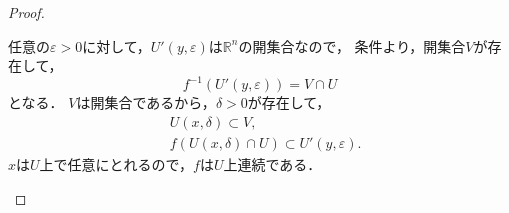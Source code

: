 \begin{leftbar}
\begin{proof}
\begin{enumerate}[(I)]
                  任意の$\varepsilon >0$に対して，$U'(y,\varepsilon)$は$\mathbb{R}^n$の開集合なので，
                  条件より，開集合$V$が存在して，
                  \[
                      f^{-1} (U'(y,\varepsilon)) = V \cap U
                  \]
                  となる．
                  $V$は開集合であるから，$\delta >0$が存在して，
                  \begin{align*}
                       & U(x,\delta)  \subset V,                          \\
                       & f(U(x,\delta) \cap U) \subset U'(y,\varepsilon).
                  \end{align*}
                  $x$は$U$上で任意にとれるので，$f$は$U$上連続である．
        \end{enumerate}
    \end{proof}
\end{leftbar}

